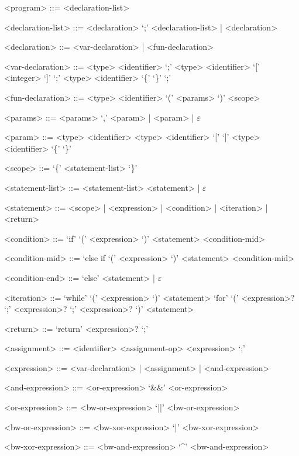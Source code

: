 \documentclass[
	article,			%
	11pt,				%
	oneside,			%
	a4paper,			%
	english,			%
	brazil,				%
	sumario=tradicional
	]{abntex2}
\begin{document}
\begin{grammar}
	
	<program> ::= <declaration-list>
		
	<declaration-list> ::= <declaration> `;' <declaration-list> | <declaration>
	
	<declaration> ::= <var-declaration> | <fun-declaration>
	
	<var-declaration> ::= <type> <identifier> `;'
	\alt <type> <identifier> `[' <integer> `]' `;'
	\alt <type> <identifier> `\{' `\}' `;'
	
	<fun-declaration> ::= <type> <identifier> `(' <params> `)' <scope>
		
	<params> ::= <params> `,' <param> | <param> | $\varepsilon$
	
	<param> ::= <type> <identifier>
	\alt <type> <identifier> `[' `]'
	\alt <type> <identifier> `\{' `\}'
	
	<scope> ::= `\{' <statement-list> `\}'
	
	<statement-list> ::= <statement-list> <statement> | $\varepsilon$
	
	<statement> ::= <scope> | <expression> | <condition> | <iteration> | <return>
	
	<condition> ::= `if' `(' <expression> `)' <statement> <condition-mid>
		
	<condition-mid> ::= `else if `(' <expression> `)' <statement> <condition-mid>
	\alt <condition-end>
	
	<condition-end> ::= `else' <statement> | $\varepsilon$
	
	<iteration> ::= `while' `(' <expression> `)' <statement>
	\alt `for' `(' <expression>? `;' <expression>? `;' <expression>? `)' <statement>
	
	<return> ::= `return' <expression>? `;'
	
	<assignment> ::= <identifier> <assignment-op> <expression> `;'
	
	<expression> ::= <var-declaration> | <assignment> | <and-expression>
	
	<and-expression> ::= <or-expression>
	\alt <and-expression> `&&' <or-expression>
	
	<or-expression> ::= <bw-or-expression>
	\alt <or-expression> `||' <bw-or-expression>
	
	<bw-or-expression> ::= <bw-xor-expression>
	\alt <bw-or-expression> `|' <bw-xor-expression>
	
	<bw-xor-expression> ::= <bw-and-expression>
	\alt <bw-xor-expression> `^' <bw-and-expression>
	

\end{grammar}
\end{document}
